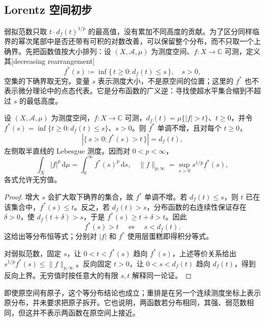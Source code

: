 \subsection{Lorentz 空间初步}
\label{b2:subsec:170203}

弱拟范数只取 \(t\cdot d_f(t)^{1/p}\) 的最高值，没有累加不同高度的贡献。为了区分同样临界的幂次尾部中是否还带有可积的对数改善，可以保留整个分布，而不只取一个上确界。先把函数值按大小排列：设 \((X,\mathcal A,\mu)\) 为测度空间、\(f:X\to\mathbb C\) 可测，定义其[decreasing rearrangement]
\[f^*(s)\coloneqq\inf\{\,t\geq0:d_f(t)\leq s\,\},\quad s>0,\]
空集的下确界取无穷。变量 \(s\) 表示测度大小，不是原空间的位置；这里的 \(f^*\) 也不表示微分理论中的点态代表。它是分布函数的广义逆：寻找使超水平集合缩到不超过 \(s\) 的最低高度。

\begin{proposition}[重排与等分布]\label{b2:prop:17-rearrangement}
设 \((X,\mathcal A,\mu)\) 为测度空间，\(f:X\to\mathbb C\) 可测，\(d_f(t)=\mu\{|f|>t\}\)、\(t\geq0\)，并令 \(f^*(s)=\inf\{t\geq0:d_f(t)\leq s\}\)、\(s>0\)。则 \(f^*\) 单调不增，且对每个 \(t\geq0\)，
\[|\{\,s>0:f^*(s)>t\,\}|=d_f(t),\]
左侧取半直线的 Lebesgue 测度。因而对 \(0<p<\infty\)，
\[\int_X|f|^p\,\mathrm d\mu=\int_0^\infty f^*(s)^p\,\mathrm ds,\quad
 \|f\|_{p,\infty}=\sup_{s>0}s^{1/p}f^*(s),\]
各式允许无穷值。
\end{proposition}
\begin{proof}
增大 \(s\) 会扩大取下确界的集合，故 \(f^*\) 单调不增。若 \(d_f(t)\leq s\)，则 \(t\) 已在该集合中，\(f^*(s)\leq t\)。反之，若 \(d_f(t)>s\)，分布函数的右连续性保证存在 \(\delta>0\)，使 \(d_f(t+\delta)>s\)，于是 \(f^*(s)\geq t+\delta>t\)。因此
\[f^*(s)>t\quad\Longleftrightarrow\quad s<d_f(t).\]
这给出等分布恒等式；分别对 \(|f|\) 和 \(f^*\) 使用层蛋糕即得积分等式。

对弱拟范数，固定 \(s\)，让 \(0<t<f^*(s)\) 趋向 \(f^*(s)\)，上述等价关系给出 \(s^{1/p}f^*(s)\leq\|f\|_{p,\infty}\)。反向固定 \(t>0\)，让 \(0<s<d_f(t)\) 趋向 \(d_f(t)\)，得到反向上界。无穷值时按任意大的有限 \(s,t\) 解释同一论证。
\end{proof}
即使原空间有原子，这个等分布结论也成立；重排是在另一个连续测度坐标上表示原分布，并未要求把原子拆开。它也说明，两函数若分布相同，其强、弱范数相同，但这并不表示两函数在原空间上接近。

\ProseParagraphBreak

